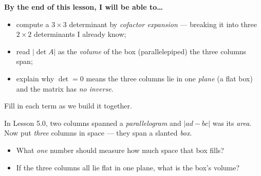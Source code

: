\documentclass[10pt]{article}
\begin{document}
\namedateperiod

\vspace{0.12in}

\begin{objectivebox}
\textbf{By the end of this lesson, I will be able to\dots}
\begin{itemize}\setlength{\itemsep}{2pt}
  \item compute a $3\times3$ determinant by \emph{cofactor expansion} --- breaking it into three $2\times2$ determinants I already know;
  \item read $|\det A|$ as the \emph{volume} of the box (parallelepiped) the three columns span;
  \item explain why $\det=0$ means the three columns lie in one \emph{plane} (a flat box) and the matrix has \emph{no inverse}.
\end{itemize}
\end{objectivebox}

\vspace{0.06in}

\begin{vocabbox}
\small
Fill in each term as we build it together.
\vspace{2pt}
\end{vocabbox}

\begin{hookbox}
In Lesson 5.0, two columns spanned a \emph{parallelogram} and $|ad-bc|$ was its \emph{area}. Now put
\emph{three} columns in space --- they span a slanted \emph{box}.
\begin{itemize}\setlength{\itemsep}{1pt}
  \item What \emph{one} number should measure how much space that box fills? 
  \item If the three columns all lie flat in one plane, what is the box's volume? 
\end{itemize}
\end{hookbox}
\end{document}
